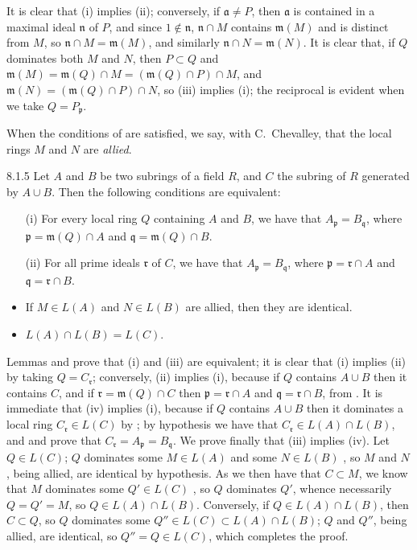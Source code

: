 \documentclass{book}
\begin{document}
It is clear that (i) implies (ii); conversely, if $\mathfrak{a}\neq P$, then
$\mathfrak{a}$ is contained in a maximal ideal $\mathfrak{n}$ of $P$, and since
$1\not\in\mathfrak{n}$, $\mathfrak{n}\cap M$ contains $\mathfrak{m}(M)$ and is
distinct from $M$, so $\mathfrak{n}\cap M=\mathfrak{m}(M)$, and similarly
$\mathfrak{n}\cap N=\mathfrak{m}(N)$. It is clear that, if $Q$ dominates both
$M$ and $N$, then $P\subset Q$ and $\mathfrak{m}(M)=\mathfrak{m}(Q)\cap
M=(\mathfrak{m}(Q)\cap P)\cap M$, and $\mathfrak{m}(N)=(\mathfrak{m}(Q)\cap
P)\cap N$, so (iii) implies (i); the reciprocal is evident when we take
$Q=P_\mathfrak{p}$.

When the conditions of  are satisfied, we say, with C.~Chevalley,
that the local rings $M$ and $N$ are \emph{allied}.

\begin{envs}[Proposition]{8.1.5}
\label{prop-1.8.1.5}
Let $A$ and $B$ be two subrings of a field $R$,
and $C$ the subring of $R$ generated by $A\cup B$. Then the following
conditions are equivalent:
\begin{itemize}
  \item[(i)] For every local ring $Q$ containing $A$ and $B$, we have that
  $A_\mathfrak{p}=B_\mathfrak{q}$, where $\mathfrak{p}=\mathfrak{m}(Q)\cap A$ and
$\mathfrak{q}=\mathfrak{m}(Q)\cap B$.
  \item[(ii)] For all prime ideals $\mathfrak{r}$
of $C$, we have that $A_\mathfrak{p}=B_\mathfrak{q}$, where
$\mathfrak{p}=\mathfrak{r}\cap A$ and $\mathfrak{q}=\mathfrak{r}\cap B$. \item
If $M\in L(A)$ and $N\in L(B)$ are allied, then they are identical. \item
$L(A)\cap L(B)=L(C)$.
\end{itemize}
\end{envs}

Lemmas  and  prove that (i) and (iii) are equivalent; it
is clear that (i) implies (ii) by taking $Q=C_\mathfrak{r}$; conversely, (ii)
implies (i), because if $Q$ contains $A\cup B$ then it contains $C$, and if
$\mathfrak{r}=\mathfrak{m}(Q)\cap C$ then $\mathfrak{p}=\mathfrak{r}\cap A$ and
$\mathfrak{q}=\mathfrak{r}\cap B$, from . It is immediate that (iv)
implies (i), because if $Q$ contains $A\cup B$ then it dominates a local ring
$C_\mathfrak{r}\in L(C)$ by ; by hypothesis we have that
$C_\mathfrak{r}\in L(A)\cap L(B)$, and  and  prove that
$C_\mathfrak{r}=A_\mathfrak{p}=B_\mathfrak{q}$. We prove finally that (iii)
implies (iv). Let $Q\in L(C)$; $Q$ dominates some $M\in L(A)$ and some $N\in
L(B)$ , so $M$ and $N$, being allied, are identical by hypothesis.
As we then have that $C\subset M$, we know that $M$ dominates some $Q'\in L(C)$
, so $Q$ dominates $Q'$, whence necessarily  $Q=Q'=M$,
so $Q\in L(A)\cap L(B)$. Conversely, if $Q\in L(A)\cap L(B)$, then $C\subset
Q$, so  $Q$ dominates some $Q''\in L(C)\subset L(A)\cap L(B)$; $Q$
and $Q''$, being allied, are identical, so $Q''=Q\in L(C)$, which completes the
proof.
\end{document}
